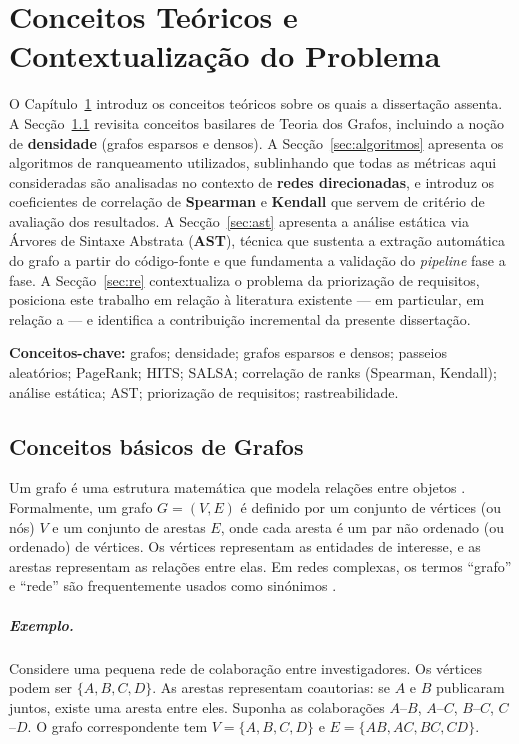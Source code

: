 \chapter{Conceitos Teóricos e Contextualização do Problema}
\label{ch:fundamentos}

O Capítulo~\ref{ch:fundamentos} introduz os conceitos teóricos sobre
os quais a dissertação assenta. A Secção~\ref{sec:grafos} revisita
conceitos basilares de Teoria dos Grafos, incluindo a noção de
\textbf{densidade} (grafos esparsos e densos). A
Secção~\ref{sec:algoritmos} apresenta os algoritmos de ranqueamento
utilizados, sublinhando que todas as métricas aqui consideradas são
analisadas no contexto de \textbf{redes direcionadas}, e introduz os
coeficientes de correlação de \textbf{Spearman} e \textbf{Kendall}
que servem de critério de avaliação dos resultados. A
Secção~\ref{sec:ast} apresenta a análise estática via Árvores de
Sintaxe Abstrata (\textbf{AST}), técnica que sustenta a extração
automática do grafo a partir do código-fonte e que fundamenta a
validação do \emph{pipeline} fase a fase. A Secção~\ref{sec:re}
contextualiza o problema da priorização de requisitos, posiciona este
trabalho em relação à literatura existente --- em particular, em
relação a \citet{silva2018} --- e identifica a contribuição
incremental da presente dissertação.

\noindent\textbf{Conceitos-chave:} grafos; densidade; grafos esparsos
e densos; passeios aleatórios; PageRank; HITS; SALSA; correlação de
ranks (Spearman, Kendall); análise estática; AST; priorização de
requisitos; rastreabilidade.

\section{Conceitos básicos de Grafos}
\label{sec:grafos}

Um grafo é uma estrutura matemática que modela relações entre objetos
\parencite{newman2010, szwarcfiter2018}. Formalmente, um grafo
$G = (V,E)$ é definido por um conjunto de vértices (ou nós) $V$ e um
conjunto de arestas $E$, onde cada aresta é um par não ordenado (ou
ordenado) de vértices. Os vértices representam as entidades de
interesse, e as arestas representam as relações entre elas. Em redes
complexas, os termos ``grafo'' e ``rede'' são frequentemente usados
como sinónimos \parencite{newman2010}.

\paragraph{Exemplo.} Considere uma pequena rede de colaboração entre
investigadores. Os vértices podem ser $\{A,B,C,D\}$. As arestas
representam coautorias: se $A$ e $B$ publicaram juntos, existe uma
aresta entre eles. Suponha as colaborações $A$--$B$, $A$--$C$,
$B$--$C$, $C$--$D$. O grafo correspondente tem $V = \{A,B,C,D\}$ e
$E = \{AB,AC,BC,CD\}$.

